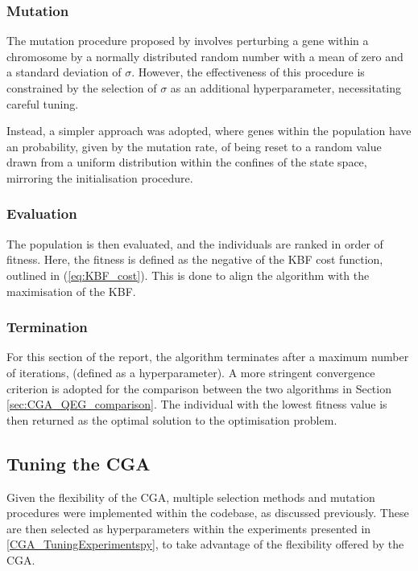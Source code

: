 \documentclass[10pt]{article}
\begin{document}
\begin{multicols}{2}
\subsubsection{Mutation}

The mutation procedure proposed by \cite{PGA} involves perturbing a gene within a chromosome by a normally distributed random number with a mean of zero and a standard deviation of $\sigma$. However, the effectiveness of this procedure is constrained by the selection of $\sigma$ as an additional hyperparameter, necessitating careful tuning. 

Instead, a simpler approach was adopted, where genes within the population have an probability, given by the mutation rate, of being reset to a random value drawn from a uniform distribution within the confines of the state space, mirroring the initialisation procedure.

\subsubsection{Evaluation}

The population is then evaluated, and the individuals are ranked in order of fitness. Here, the fitness is defined as the negative of the KBF cost function, outlined in (\ref{eq:KBF_cost}). This is done to align the algorithm with the maximisation of the KBF.

\subsubsection{Termination}

For this section of the report, the algorithm terminates after a maximum number of iterations, (defined as a hyperparameter). A more stringent convergence criterion is adopted for the comparison between the two algorithms in Section \ref{sec:CGA_QEG_comparison}. The individual with the lowest fitness value is then returned as the optimal solution to the optimisation problem.

\subsection{Tuning the CGA}
\label{sec:CGA_selection_mutation}

Given the flexibility of the CGA, multiple selection methods and mutation procedures were implemented within the codebase, as discussed previously. These are then selected as hyperparameters within the experiments presented in \ref{CGA_TuningExperimentspy}, to take advantage of the flexibility offered by the CGA. 


\end{multicols}
\end{document}
